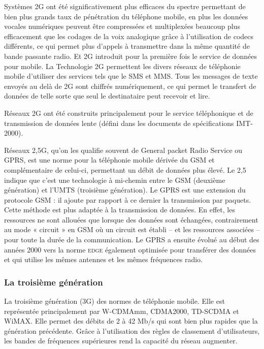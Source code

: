 Systèmes 2G ont été significativement plus efficaces du spectre permettant de bien plus grands taux de pénétration du téléphone mobile, en plus les données vocales numériques peuvent être compressées et multiplexées beaucoup plus efficacement que les codages de la voix analogique grâce à l'utilisation de codecs différents, ce qui permet plus d'appels à transmettre dans la même quantité de bande passante radio. Et 2G introduit pour la première fois le service de données pour mobile. La Technologie 2G permettent les divers réseaux de téléphonie mobile d'utiliser des services tels que le SMS et MMS. Tous les messages de texte envoyés au delà de 2G sont chiffrés numériquement, ce qui permet le transfert de données de telle sorte que seul le destinataire peut recevoir et lire.   

Réseaux 2G ont été construits principalement pour le service téléphonique et de transmission de données lente (défini dans les documents de spécifications IMT-2000).

Réseaux \textsc{2,5G}, qu'on les qualifie souvent de General packet Radio Service ou GPRS, est une norme pour la téléphonie mobile dérivée du GSM et complémentaire de celui-ci, permettant un débit de données plus élevé. Le 2,5 indique que c'est une technologie à mi-chemin entre le GSM (deuxième génération) et l'UMTS (troisième génération). Le GPRS est une extension du protocole GSM : il ajoute par rapport à ce dernier la transmission par paquets. Cette méthode est plus adaptée à la transmission de données. En effet, les ressources ne sont allouées que lorsque des données sont échangées, contrairement au mode « circuit » en GSM où un circuit est établi – et les ressources associées – pour toute la durée de la communication. Le GPRS a ensuite évolué au début des années 2000 vers la norme \textsc{edge} également optimisée pour transférer des données et qui utilise les mêmes antennes et les mêmes fréquences radio.

\subsubsection{La troisième génération}
La troisième génération (3G) des normes de téléphonie mobile. Elle est représentée principalement par W-CDMAmm, CDMA2000, TD-SCDMA et WiMAX. Elle permet des débits de 2 à 42 Mb/s qui sont bien plus rapides que la génération précédente. Grâce à l'utilisation des règles de classement d'utilisateurs, les bandes de fréquences supérieures rend la capacité du réseau augmenter.

